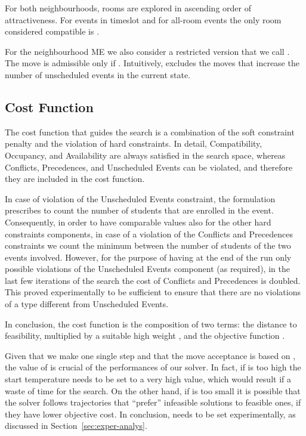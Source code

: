 \documentclass[authoryear,preprint,a4paper,12pt]{elsarticle}
\begin{document}
For both neighbourhoods, rooms are explored in ascending order of
attractiveness. For events in timeslot  and for all-room events the only room considered compatible is
.

For the neighbourhood \textsf{ME} we also consider a restricted version
that we call . The move  is
admissible only if . Intuitively, 
excludes the moves that increase the number of unscheduled events in
the current state.

\subsection{Cost Function}
\label{sec:cost-function-pectt}

The cost function that guides the search is a combination of the
soft constraint penalty and the violation of hard constraints. In
detail, \textsf{Compatibility}, \textsf{Occupancy}, and
\textsf{Availability} are always satisfied in the search space,
whereas \textsf{Conflicts}, \textsf{Precedences}, and
\textsf{Unscheduled Events} can be violated, and therefore they are
included in the cost function.

In case of violation of the \textsf{Unscheduled Events} constraint,
the formulation prescribes to count the number of students that are
enrolled in the event. Consequently, in order to have comparable
values also for the other hard constraints components, in case of a
violation of the \textsf{Conflicts} and \textsf{Precedences}
constraints we count the minimum between the number of students of the
two events involved.  However, for the purpose of having at the end of
the run only possible violations of the \textsf{Unscheduled Events}
component (as required), in the last few iterations of the search the
cost of \textsf{Conflicts} and \textsf{Precedences} is doubled. This
proved experimentally to be sufficient to ensure that there are no
violations of a type different from \textsf{Unscheduled Events}.

In conclusion, the cost function  is the composition of two
terms: the distance to feasibility, multiplied by a suitable high
weight , and the objective function .

Given that we make one single step and that the move acceptance is
based on , the value of  is crucial of the performances
of our solver. In fact, if  is too high the start temperature needs
to be set to a very high value, which would result if a waste of time
for the search.  On the other hand, if  is too small it is possible
that the solver follows trajectories that ``prefer'' infeasible
solutions to feasible ones, if they have lower objective cost. In
conclusion,  needs to be set experimentally, as discussed in
Section~\ref{sec:exper-analys}.
\end{document}
